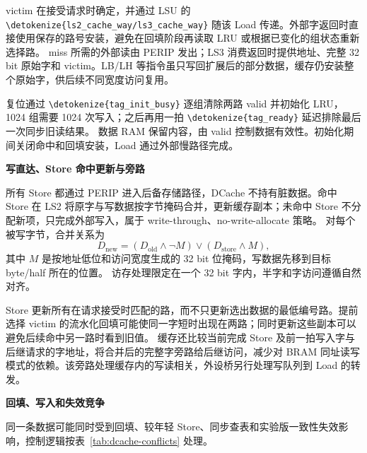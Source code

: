\documentclass[UTF8,a4paper,12pt,fontset=none,scheme=plain]{ctexart}
\newcommand{\code}[1]{\texttt{\detokenize{#1}}}
\renewcommand{\code}[1]{{\small\ttfamily\urlstyle{tt}\expandafter\nolinkurl\expandafter{\detokenize{#1}}}}
\begin{document}
victim 在接受请求时确定，并通过 LSU 的 \code{ls2_cache_way/ls3_cache_way} 随该 Load 传递。外部字返回时直接使用保存的路号安装，避免在回填阶段再读取 LRU 或根据已变化的组状态重新选择路。
miss 所需的外部读由 PERIP 发出；LS3 消费返回时提供地址、完整 32 bit 原始字和 victim。LB/LH 等指令虽只写回扩展后的部分数据，缓存仍安装整个原始字，供后续不同宽度访问复用。

复位通过 \code{tag_init_busy} 逐组清除两路 valid 并初始化 LRU，1024 组需要 1024 次写入；之后再用一拍 \code{tag_ready} 延迟排除最后一次同步旧读结果。
数据 RAM 保留内容，由 valid 控制数据有效性。初始化期间关闭命中和回填安装，Load 通过外部慢路径完成。

\medskip
\noindent\textbf{写直达、Store 命中更新与旁路}\par

所有 Store 都通过 PERIP 进入后备存储路径，DCache 不持有脏数据。命中 Store 在 LS2 将原字与写数据按字节掩码合并，更新缓存副本；未命中 Store 不分配新项，只完成外部写入，属于 write-through、no-write-allocate 策略。
对每个被写字节，合并关系为
\begin{equation}
D_{\mathrm{new}}=(D_{\mathrm{old}}\land\neg M)\lor(D_{\mathrm{store}}\land M),
\end{equation}
其中 $M$ 是按地址低位和访问宽度生成的 32 bit 位掩码，写数据先移到目标 byte/half 所在的位置。
访存处理限定在一个 32 bit 字内，半字和字访问遵循自然对齐。

Store 更新所有在请求接受时匹配的路，而不只更新选出数据的最低编号路。提前选择 victim 的流水化回填可能使同一字短时出现在两路；同时更新这些副本可以避免后续命中另一路时看到旧值。
缓存还比较当前完成 Store 及前一拍写入字与后继请求的字地址，将合并后的完整字旁路给后继访问，减少对 BRAM 同址读写模式的依赖。该旁路处理缓存内的写读相关，外设桥另行处理写队列到 Load 的转发。

\medskip
\noindent\textbf{回填、写入和失效竞争}\par

同一条数据可能同时受到回填、较年轻 Store、同步查表和实验版一致性失效影响，控制逻辑按表~\ref{tab:dcache-conflicts} 处理。
\end{document}
